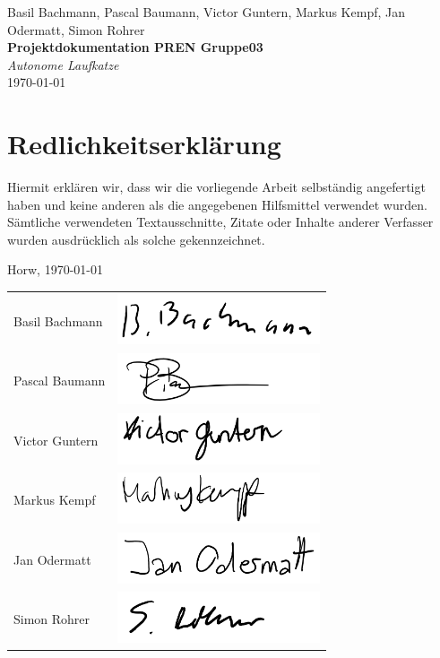 \documentclass[a4paper]{report}
\newcommand*{\titleAP}{\begingroup %
	\centering
	\vspace*{\baselineskip} %

	{Basil Bachmann, Pascal Baumann, Victor Guntern, Markus Kempf, Jan Odermatt, Simon Rohrer}\\[0.167\textheight] %

	{\Huge\bfseries Projektdokumentation PREN Gruppe03}\\[\baselineskip]

	{\Large \textit{Autonome Laufkatze}}\\
	\today

	\vspace*{3\baselineskip} %
	\endgroup}
\begin{document}

\titleAP

\newpage

\chapter*{Redlichkeitserklärung}
\label{ch*:Redlich}
Hiermit erklären wir, dass wir die vorliegende Arbeit selbständig angefertigt haben und keine anderen als die angegebenen Hilfsmittel verwendet wurden. Sämtliche verwendeten Textausschnitte, Zitate oder Inhalte anderer Verfasser wurden ausdrücklich als solche gekennzeichnet.

\vspace{1.5em}

\noindent
Horw, \today

\vspace{2em}

\noindent
\begin{tabular}{lp{}}
	Basil Bachmann & \includegraphics[height=1.5cm,keepaspectratio]{BasilBachmann}\\
	Pascal Baumann & \includegraphics[height=1.5cm,keepaspectratio]{PascalBaumann}\\
	Victor Guntern & \includegraphics[height=1.5cm,keepaspectratio]{VictorGuntern}\\
	Markus Kempf & \includegraphics[height=1.5cm,keepaspectratio]{MarkusKempf}\\
	Jan Odermatt & \includegraphics[height=1.5cm,keepaspectratio]{JanOdermatt}\\
	Simon Rohrer &  \includegraphics[height=1.5cm,keepaspectratio]{SimonRohrer}\\
\end{tabular}
\end{document}

